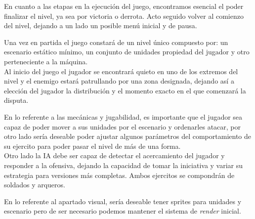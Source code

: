 En cuanto a las etapas en la ejecución del juego, encontramos esencial el poder finalizar el nivel,
ya sea por victoria o derrota. Acto seguido volver al comienzo del nivel, dejando a un lado un
posible menú inicial y de pausa.

Una vez en partida el juego constará de un nivel único compuesto por: un escenario estático
mínimo, un conjunto de unidades propiedad del jugador y otro perteneciente a la máquina.\\
Al inicio del juego el jugador se encontrará quieto en uno de los extremos del nivel y el enemigo 
estará patrullando por una zona designada, dejando así a elección del jugador la distribución y el
momento exacto en el que comenzará la disputa.

En lo referente a las mecánicas y jugabilidad, es importante que el jugador sea capaz de poder
mover a sus unidades por el escenario y ordenarles atacar, por otro lado sería deseable poder
ajustar algunos parámetros del comportamiento de su ejercito para poder pasar el nivel de más
de una forma.\\
Otro lado la \ac{IA} debe ser capaz de detectar el acercamiento del jugador y responder a la
ofensiva, dejando la capacidad de tomar la iniciativa y variar su estrategia para versiones
más completas. Ambos ejercitos se compondrán de soldados y arqueros.

En lo referente al apartado visual, sería deseable tener sprites para unidades y escenario pero
de ser necesario podemos mantener el sistema de \textit{render} inicial.
